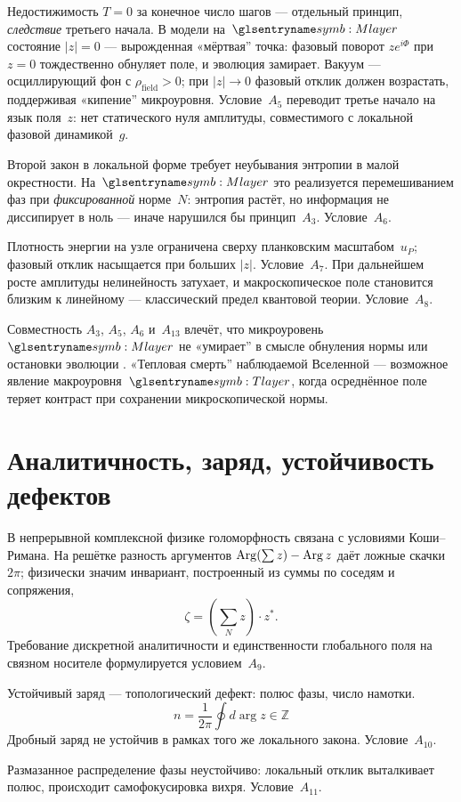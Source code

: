 Недостижимость $T=0$ за конечное число шагов --- отдельный принцип, \emph{следствие}
третьего начала.
В модели на~$\layerMicro$ состояние $|z|=0$ --- вырожденная «мёртвая'' точка:
фазовый поворот $z e^{i\Phi}$ при $z=0$ тождественно обнуляет поле, и эволюция замирает.
Вакуум --- осциллирующий фон с $\rho_{\mathrm{field}}>0$; при $|z|\to 0$ фазовый отклик
должен возрастать, поддерживая «кипение'' микроуровня.
Условие~$A_5$ переводит третье начало на язык поля~$z$: нет статического нуля амплитуды,
совместимого с локальной фазовой динамикой~$g$.

Второй закон в локальной форме требует неубывания энтропии в малой окрестности.
На~$\layerMicro$ это реализуется перемешиванием фаз при \emph{фиксированной} норме~$N$:
энтропия растёт, но информация не диссипирует в ноль --- иначе нарушился бы принцип~$A_3$.
Условие~$A_6$.

Плотность энергии на узле ограничена сверху планковским масштабом~$u_P$;
фазовый отклик насыщается при больших $|z|$.
Условие~$A_7$.
При дальнейшем росте амплитуды нелинейность затухает, и макроскопическое поле становится
близким к линейному --- классический предел квантовой теории.
Условие~$A_8$.

Совместность $A_3$, $A_5$, $A_6$ и~$A_{13}$ влечёт, что микроуровень~$\layerMicro$ не «умирает''
в смысле обнуления нормы или остановки эволюции .
«Тепловая смерть'' наблюдаемой Вселенной --- возможное явление макроуровня~$\layerMacro$,
когда осреднённое поле теряет контраст при сохранении микроскопической нормы.

\section{Аналитичность, заряд, устойчивость дефектов}

В непрерывной комплексной физике голоморфность связана с условиями Коши--Римана.
На решётке разность аргументов $\operatorname{Arg}(\sum z)-\operatorname{Arg} z$ даёт ложные скачки $2\pi$;
физически значим инвариант, построенный из суммы по соседям и сопряжения,
\[
\zeta=(\sum_N z)\cdot z^*.
\]
Требование дискретной аналитичности и единственности глобального поля на связном носителе
формулируется условием~$A_9$.

Устойчивый заряд --- топологический дефект: полюс фазы, число намотки.
\[
n=\frac{1}{2\pi}\oint d\arg z\in\mathbb{Z}
\]
Дробный заряд не устойчив в рамках того же локального закона.
Условие~$A_{10}$.

Размазанное распределение фазы неустойчиво:
локальный отклик выталкивает полюс, происходит самофокусировка вихря.
Условие~$A_{11}$.

